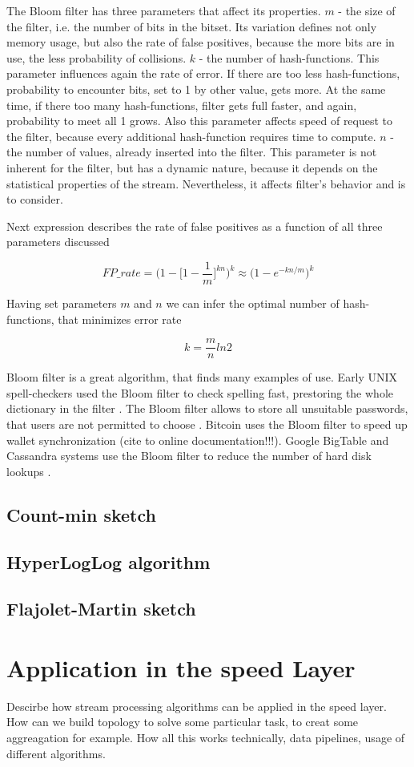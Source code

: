 The Bloom filter has three parameters that affect its properties.
$m$ - the size of the filter, i.e. the number of bits in the bitset.
Its variation defines not only memory usage, but also the rate of false positives, because the more bits are in use, the less probability of collisions.
$k$ - the number of hash-functions.
This parameter influences again the rate of error.
If there are too less hash-functions, probability to encounter bits, set to 1 by other value, gets more.
At the same time, if there too many hash-functions, filter gets full faster, and again, probability to meet all 1 grows.
Also this parameter affects speed of request to the filter, because every additional hash-function requires time to compute.
$n$ - the number of values, already inserted into the filter.
This parameter is not inherent for the filter, but has a dynamic nature, because it depends on the statistical properties of the stream.
Nevertheless, it affects filter's behavior and is to consider.

Next expression describes the rate of false positives as a function of all three parameters discussed

$$
FP\_rate = \Bigg(1 - \Bigg[1 - \frac{1}{m}\Bigg]^{kn}\Bigg)^k \approx \Big(1 - e^{-kn/m}\Big)^k
$$

Having set parameters $m$ and $n$ we can infer the optimal number of hash-functions, that minimizes error rate

$$
k = \frac{m}{n}ln2
$$

Bloom filter is a great algorithm, that finds many examples of use.
Early UNIX spell-checkers used the Bloom filter to check spelling fast, prestoring the whole dictionary in the filter \cite{BroderMitzenmacher}.
The Bloom filter allows to store all unsuitable passwords, that users are not permitted to choose \cite{BroderMitzenmacher}.
Bitcoin uses the Bloom filter to speed up wallet synchronization (cite to online documentation!!!).
Google BigTable and Cassandra systems use the Bloom filter to reduce the number of hard disk lookups \cite{Bigtable/Chang_Dean_Ghemawat}.

\subsection{Count-min sketch}



\subsection{HyperLogLog algorithm}
\subsection{Flajolet-Martin sketch}

\section{Application in the speed Layer}

Descirbe how stream processing algorithms can be applied in the speed layer.
How can we build topology to solve some particular task, to creat some aggreagation for example.
How all this works technically, data pipelines, usage of different algorithms.